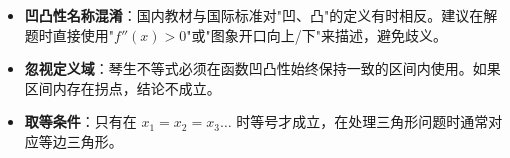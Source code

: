 \begin{trapbox}
\begin{itemize}
    \item \textbf{凹凸性名称混淆}：国内教材与国际标准对"凹、凸"的定义有时相反。建议在解题时直接使用"$f''(x)>0$"或"图象开口向上/下"来描述，避免歧义。
    \item \textbf{忽视定义域}：琴生不等式必须在函数凹凸性始终保持一致的区间内使用。如果区间内存在拐点，结论不成立。
    \item \textbf{取等条件}：只有在 $x_1=x_2=x_3\dots$ 时等号才成立，在处理三角形问题时通常对应等边三角形。
\end{itemize}
\end{trapbox}